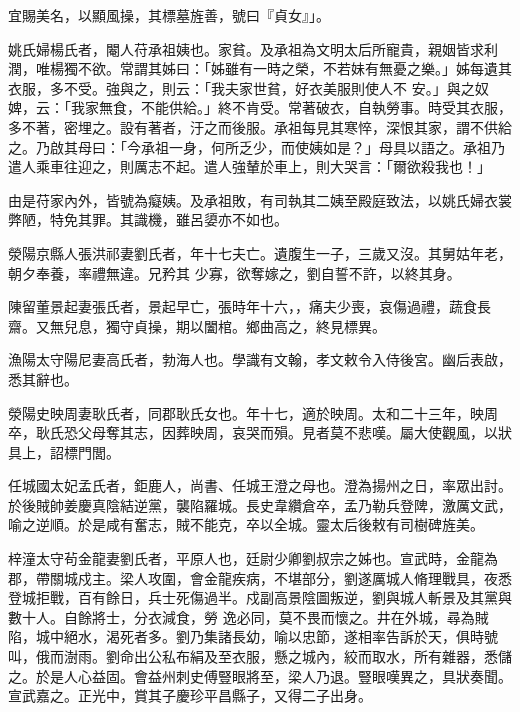 \begin{pinyinscope}
 宜賜美名，以顯風操，其標墓旌善，號曰『貞女』」。



 姚氏婦楊氏者，閹人苻承祖姨也。家貧。及承祖為文明太后所寵貴，親姻皆求利潤，唯楊獨不欲。常謂其姊曰：「姊雖有一時之榮，不若妹有無憂之樂。」姊每遺其衣服，多不受。強與之，則云：「我夫家世貧，好衣美服則使人不
 安。」與之奴婢，云：「我家無食，不能供給。」終不肯受。常著破衣，自執勞事。時受其衣服，多不著，密埋之。設有著者，汙之而後服。承祖每見其寒悴，深恨其家，謂不供給之。乃啟其母曰：「今承祖一身，何所乏少，而使姨如是？」母具以語之。承祖乃遣人乘車往迎之，則厲志不起。遣人強輦於車上，則大哭言：「爾欲殺我也！」



 由是苻家內外，皆號為癡姨。及承祖敗，有司執其二姨至殿庭致法，以姚氏婦衣裳弊陋，特免其罪。其識機，雖呂嬃亦不如也。



 滎陽京縣人張洪祁妻劉氏者，年十七夫亡。遺腹生一子，三歲又沒。其舅姑年老，朝夕奉養，率禮無違。兄矜其
 少寡，欲奪嫁之，劉自誓不許，以終其身。



 陳留董景起妻張氏者，景起早亡，張時年十六，，痛夫少喪，哀傷過禮，蔬食長齋。又無兒息，獨守貞操，期以闔棺。鄉曲高之，終見標異。



 漁陽太守陽尼妻高氏者，勃海人也。學識有文翰，孝文敕令入侍後宮。幽后表啟，悉其辭也。



 滎陽史映周妻耿氏者，同郡耿氏女也。年十七，適於映周。太和二十三年，映周卒，耿氏恐父母奪其志，因葬映周，哀哭而殞。見者莫不悲嘆。屬大使觀風，以狀具上，詔標門閭。



 任城國太妃孟氏者，鉅鹿人，尚書、任城王澄之母也。澄為揚州之日，率眾出討。於後賊帥姜慶真陰結逆黨，襲陷羅城。長史韋纘倉卒，孟乃勒兵登陴，激厲文武，喻之逆順。於是咸有奮志，賊不能克，卒以全城。靈太后後敕有司樹碑旌美。



 梓潼太守茍金龍妻劉氏者，平原人也，廷尉少卿劉叔宗之姊也。宣武時，金龍為郡，帶關城戍主。梁人攻圍，會金龍疾病，不堪部分，劉遂厲城人脩理戰具，夜悉登城拒戰，百有餘日，兵士死傷過半。戍副高景陰圖叛逆，劉與城人斬景及其黨與數十人。自餘將士，分衣減食，勞
 逸必同，莫不畏而懷之。井在外城，尋為賊陷，城中絕水，渴死者多。劉乃集諸長幼，喻以忠節，遂相率告訴於天，俱時號叫，俄而澍雨。劉命出公私布絹及至衣服，懸之城內，絞而取水，所有雜器，悉儲之。於是人心益固。會益州刺史傅豎眼將至，梁人乃退。豎眼嘆異之，具狀奏聞。宣武嘉之。正光中，賞其子慶珍平昌縣子，又得二子出身。




\end{pinyinscope}
